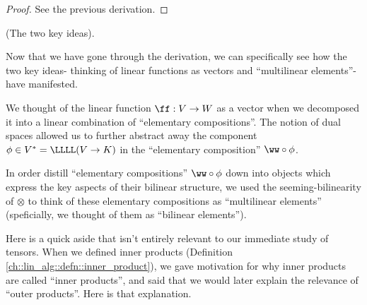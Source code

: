 \begin{proof}
    See the previous derivation.
\end{proof}

\begin{remark}
    (The two key ideas). 
    
    Now that we have gone through the derivation, we can specifically see how the two key ideas- thinking of linear functions as vectors and ``multilinear elements''- have manifested.
    
    We thought of the linear function $\ff:V \rightarrow W$ as a vector when we decomposed it into a linear combination of ``elementary compositions''. The notion of dual spaces allowed us to further abstract away the component $\phi \in V^* = \LLLL(V \rightarrow K)$ in the ``elementary composition'' $\ww \circ \phi$.
    
    In order distill ``elementary compositions'' $\ww \circ \phi$ down into objects which express the key aspects of their bilinear structure, we used the seeming-bilinearity of $\otimes$ to think of these elementary compositions as ``multilinear elements'' (speficially, we thought of them as ``bilinear elements'').
\end{remark}

Here is a quick aside that isn't entirely relevant to our immediate study of tensors. When we defined inner products (Definition \ref{ch::lin_alg::defn::inner_product}), we gave motivation for why inner products are called ``inner products'', and said that we would later explain the relevance of ``outer products''. Here is that explanation. 

